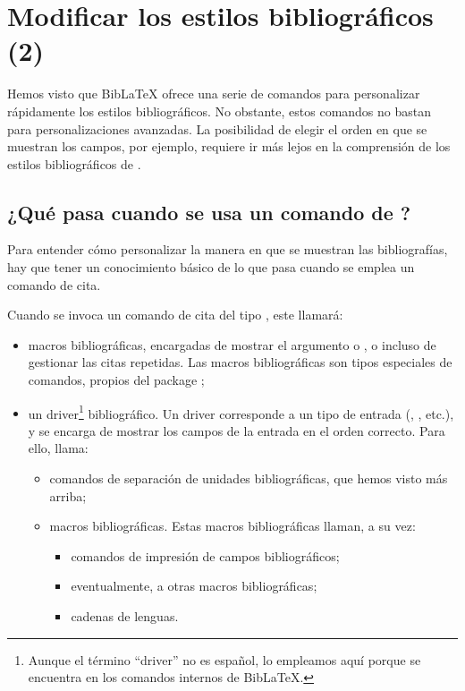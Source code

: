 \chapter{Modificar los estilos bibliográficos (2)}\label{style2}


\begin{intro}
    Hemos visto que BibLaTeX ofrece una serie de comandos para personalizar rápidamente los estilos bibliográficos. No obstante, estos comandos no bastan para personalizaciones avanzadas.
    La posibilidad de elegir el orden en que se muestran los campos, por ejemplo, requiere ir más lejos en la comprensión de los estilos bibliográficos de .
\end{intro}



\section[¿Qué pasa cuando se usa \oldcs{\meta{prefijo}cite}?]{¿Qué pasa cuando se usa un comando de ?}

Para entender cómo personalizar la manera en que se muestran las bibliografías, hay que tener un conocimiento básico de lo que pasa cuando se emplea un comando de cita.


Cuando se invoca un comando de cita del tipo , este llamará:
    \begin{itemize}
        \item macros bibliográficas, encargadas de mostrar el argumento   o , o incluso de gestionar las citas repetidas. Las macros bibliográficas son tipos especiales de comandos, propios del  package ;\label{macrobiblio} 
        \item un driver\footnote{Aunque el término \enquote{driver} no es español, lo empleamos aquí porque se encuentra en los comandos internos de BibLaTeX.} bibliográfico. Un driver corresponde a un tipo de entrada (, , etc.), y se encarga de mostrar los campos de la entrada en el orden correcto. Para ello, llama:
        \begin{itemize}
            \item comandos de separación de unidades bibliográficas, que hemos visto más arriba;
            \item macros bibliográficas. Estas macros bibliográficas llaman, a su vez:
            \begin{itemize}
                \item comandos de impresión de campos bibliográficos;
                \item eventualmente, a otras macros bibliográficas;
                \item cadenas de lenguas.
            \end{itemize}
        \end{itemize}
        
    \end{itemize}

